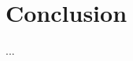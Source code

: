 \documentclass[journal, a4paper]{IEEEtran}
\begin{document}
\section{Conclusion}
...
\newline 



\end{document}
